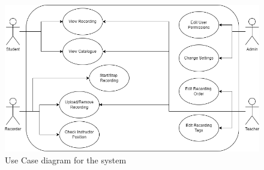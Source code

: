 \documentclass[12pt, conference]{IEEEtran}
\begin{document}
\begin{figure}
    \centering
    \includegraphics[width=22cm]{images/usecase.png}
    \caption{Use Case diagram for the system}
\end{figure}

\twocolumn
\end{document}
